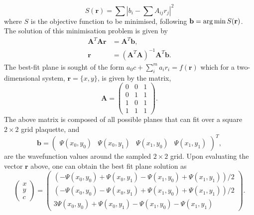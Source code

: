  \begin{equation}
 S(\mathbf{r}) = \displaystyle\sum |b_i - \displaystyle\sum A_{ij} r_j |^2
 \end{equation}
 where $S$ is the objective function to be minimised, following $\mathbf{b} = \operatorname*{arg\,min} S(\mathbf{r})$. The solution of this minimisation problem is given by
 \begin{subequations}
\begin{align}
    \mathbf{A} ^{T}\mathbf{A} \mathbf{r} &= \mathbf{A} ^{T}\mathbf{b}, \\
    \mathbf{r} &= (\mathbf{A}^{T}\mathbf{A})^{-1}\mathbf{A}^{T}\mathbf{b}.
\end{align}
\end{subequations}
The best-fit plane is sought of the form
$a_0 c + \displaystyle\sum\limits_{i}^{m} a_i r_i = f(\mathbf{r})$
which for a two-dimensional system, $\mathbf{r} = \{x,y\}$, is given by the matrix,
\begin{equation}
    \mathbf{A} = \left(
    \begin{array}{ccc}
        0 & 0 & 1 \\
        0 & 1 & 1 \\
        1 & 0 & 1 \\
        1 & 1 & 1
    \end{array}\right).
\end{equation}
The above matrix is composed of all possible planes that can fit over a square $2\times 2$ grid plaquette,
and
\begin{equation}
    \mathbf{b} = \left(
    \begin{array}{cccc}
        \Psi(x_0,y_0) & \Psi(x_0,y_1) & \Psi(x_1,y_0) & \Psi(x_1,y_1)
    \end{array} \right)^{T},
\end{equation}
are the wavefunction values around the sampled $2\times 2$ grid.
Upon evaluating the vector $\mathbf{r}$ above, one can obtain the best fit plane  solution as
\begin{equation}\left(
    \begin{array}{c}
        x \\
        y \\
        c
    \end{array}\right)
    = \left(
    \begin{array}{c}
        {\left( -\Psi(x_0,y_0) + \Psi(x_0,y_1) - \Psi(x_1,y_0) + \Psi(x_1,y_1) \right)}{/2} \\
        {\left( -\Psi(x_0,y_0) - \Psi(x_0,y_1) + \Psi(x_1,y_0) + \Psi(x_1,y_1) \right)}{/2} \\
        3\Psi(x_0,y_0) + \Psi(x_0,y_1) - \Psi(x_1,y_0) - \Psi(x_1,y_1)
    \end{array}\right).
\end{equation}


